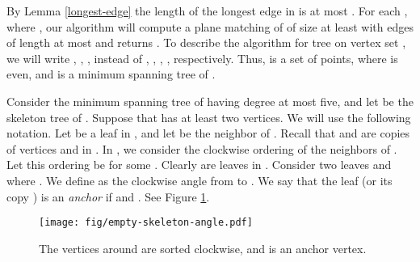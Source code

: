 \documentclass[11pt,a4paper]{article}
\begin{document}
By Lemma \ref{longest-edge} the length of the longest edge in  is at most . For each , where , our algorithm will compute a plane matching  of  of size at least  with edges of length at most  and returns . To describe the algorithm for tree  on vertex set , we will write , , ,  instead of , , , , respectively. Thus,  is a set of  points, where  is even, and  is a minimum spanning tree of .

\iffalse
In this section we present another approximation algorithm which gives a plane matching  of size  with bottleneck length . Start by computing a minimum spanning tree  of . Let  be the longest edge in , and
let  denote its length. Let  and  be the two trees obtained by removing
 from . If  has an odd number of nodes, then, clearly, , otherwise, both  and  have an even number of nodes. In the latter case, we remove  from  and we recursively perform this algorithm on  and . We partition  to trees  with vertex sets  respectively. Each tree , where , has an even number of nodes denoted by . That is, we remove every edge  that splits  into two trees  and  of even cardinality (not necessarily ), and obtain a forest  such that each tree in  has an even number of nodes and cannot be further partitioned. Clearly there is no node of even degree (in each tree of ). For each , our algorithm will compute a plane matching  of  of size at least  with edges of length at most  and returns . To describe the algorithm for tree  on vertex set , we will write , , ,  instead of , , , , respectively. Thus,  is a set of  points, where  is even, and  is a minimum spanning tree of .
\fi


Consider the minimum spanning tree  of  having degree at most five, and let  be the skeleton tree of . Suppose that  has at least two vertices. We will use the following notation. Let  be a leaf in , and let  be the neighbor of . Recall that  and  are copies of vertices  and  in . In , we consider the clockwise ordering of the neighbors of . Let this ordering be  for some . Clearly  are leaves in . Consider two leaves  and  where . We define  as the clockwise angle from  to . We say that the leaf  (or its copy ) is an {\em anchor} if  and . See Figure \ref{empty-skeleton-angle-fig}.

\begin{figure}[ht]
  \centering
    \texttt{[image: fig/empty-skeleton-angle.pdf]}
  \caption{The vertices around  are sorted clockwise, and  is an anchor vertex.}
\label{empty-skeleton-angle-fig}
\end{figure}
\end{document}
